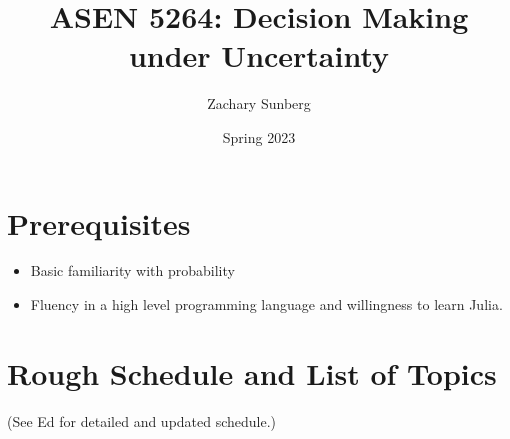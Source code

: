 \documentclass[9pt]{article}
\title{ASEN 5264: Decision Making under Uncertainty}
\author{Zachary Sunberg}
\date{Spring 2023}
\begin{document}
\maketitle

\section*{Prerequisites}

\begin{itemize}[nosep]
    \item Basic familiarity with probability
    \item Fluency in a high level programming language and willingness to learn Julia.
\end{itemize}

\section*{Rough Schedule and List of Topics}

(See Ed for detailed and updated schedule.)
\end{document}
